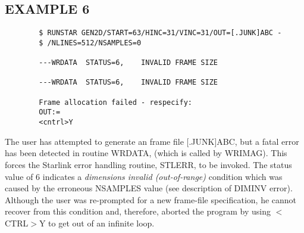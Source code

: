 \subsection {EXAMPLE 6}
\begin{verbatim}
        $ RUNSTAR GEN2D/START=63/HINC=31/VINC=31/OUT=[.JUNK]ABC -
        $ /NLINES=512/NSAMPLES=0

        ---WRDATA  STATUS=6,    INVALID FRAME SIZE

        ---WRDATA  STATUS=6,    INVALID FRAME SIZE

        Frame allocation failed - respecify:
        OUT:=
        <cntrl>Y
\end{verbatim}
The user has attempted to generate an frame file [.JUNK]ABC, but a fatal error
has been detected in routine WRDATA, (which is called by WRIMAG).
This forces the Starlink error handling routine, STLERR, to be invoked.
The status value of 6 indicates a {\em dimensions invalid (out-of-range)}
condition which was caused by the erroneous NSAMPLES value (see description of
DIMINV error).
Although the user was re-prompted for a new frame-file specification, he cannot
recover from this condition and, therefore, aborted the program by using
$<$CTRL$>$Y to get out of an infinite loop.

